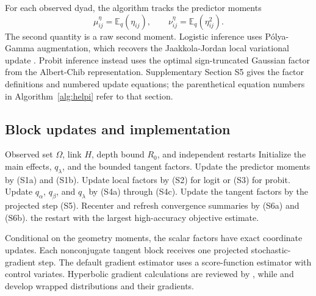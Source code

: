 \documentclass[
  12pt]{article}
\theoremstyle{definition}
\theoremstyle{plain}
\newcommand{\E}{\mathbb E}
\begin{document}
For each observed dyad, the algorithm tracks the predictor moments
\[
\mu_{ij}^{\eta}=\E_q(\eta_{ij}),
\qquad
\nu_{ij}^{\eta}=\E_q(\eta_{ij}^2).
\]
The second quantity is a raw second moment. Logistic inference uses P\'olya-Gamma augmentation, which recovers the Jaakkola-Jordan local variational update \citep{jaakkola_2000_BayesianParameterEstimation,polson_2013_BayesianInferenceLogistic,durante_2019_ConditionallyConjugateMeanField}. Probit inference instead uses the optimal sign-truncated Gaussian factor from the Albert-Chib representation. Supplementary Section S5 gives the factor definitions and numbered update equations; the parenthetical equation numbers in Algorithm~\ref{alg:helpi} refer to that section.




\subsection{Block updates and implementation}



\begin{algorithm}[tbp]
\caption{Blockwise mean-field variational inference for binary HELPI}
\label{alg:helpi}
\begin{algorithmic}[1]
\Require Observed set $\Omega$, link $H$, depth bound $R_0$, and independent restarts
\State Initialize the main effects, $q_\lambda$, and the bounded tangent factors.
\Repeat
\State Update the predictor moments by (S1a) and (S1b).
\State Update local factors by (S2) for logit or (S3) for probit.
\State Update $q_\alpha$, $q_\beta$, and $q_\lambda$ by (S4a) through (S4c).
\State Update the tangent factors by the projected step (S5).
\State Recenter and refresh convergence summaries by (S6a) and (S6b).
\State \Return the restart with the largest high-accuracy objective estimate.
\end{algorithmic}
\end{algorithm}



Conditional on the geometry moments, the scalar factors have exact coordinate updates. Each nonconjugate tangent block receives one projected stochastic-gradient step. The default gradient estimator uses a score-function estimator with control variates. Hyperbolic gradient calculations are reviewed by \citet{wilson_2018_GradientDescentHyperbolic}, while \citet{mathieu_2019_ContinuousHierarchicalRepresentations} and \citet{nagano_2019_WrappedNormalDistribution} develop wrapped distributions and their gradients.
\end{document}
